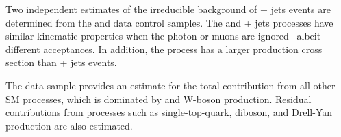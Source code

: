 Two independent estimates of the irreducible background of \znunu +
jets events are determined from the \gj and \mmj data control samples.
The \gj and \zmumu + jets processes have similar kinematic properties
when the photon or muons are ignored~\cite{Bern:2011pa} albeit
different acceptances. In addition, the \gj process has a larger
production cross section than \znunu + jets events.

The \mj data sample provides an estimate for the total
contribution from all other SM processes, which is dominated by \ttbar
and W-boson production. Residual contributions from processes such as
single-top-quark, diboson, and Drell-Yan production are also
estimated.%


